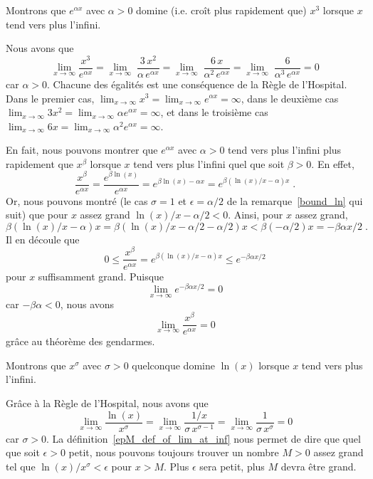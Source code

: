 {\begin{egg}
Montrons que $e^{\alpha x}$ avec $\alpha>0$ domine (i.e. croît plus
rapidement que) $x^3$ lorsque $x$ tend vers plus l'infini.

Nous avons que
\[
\lim_{x\rightarrow \infty} \frac{x^3}{e^{\alpha x}}
= \lim_{x\rightarrow \infty}\; \frac{3\,x^2}{\alpha\,e^{\alpha x}}
= \lim_{x\rightarrow \infty}\; \frac{6\,x}{\alpha^2\,e^{\alpha x}}
= \lim_{x\rightarrow \infty}\; \frac{6}{\alpha^3\,e^{\alpha x}} = 0
\]
car $\alpha>0$.  Chacune des égalités est une conséquence de la Règle
de l'Hospital.  Dans le premier cas,
$\displaystyle \lim_{x\to \infty} x^3 = \lim_{x\to \infty} e^{\alpha x}
= \infty$, dans le deuxième cas 
$\displaystyle \lim_{x\to \infty} 3x^2 = \lim_{x\to \infty} \alpha e^{\alpha x}
= \infty$, et dans le troisième cas
$\displaystyle \lim_{x\to \infty} 6x = \lim_{x\to \infty} \alpha^2 e^{\alpha x}
= \infty$.
\end{egg}

\begin{rmk}[\theory]
En fait, nous pouvons montrer que $e^{\alpha x}$ avec $\alpha>0$ tend
vers plus l'infini plus rapidement que $x^\beta$ lorsque $x$ tend
vers plus l'infini quel que soit $\beta>0$.  En effet,
\[
\frac{x^\beta}{e^{\alpha x}} = \frac{e^{\beta\ln(x)}}{ e^{\alpha x}}
= e^{\beta\ln(x)-\alpha x} = e^{\beta \left( \ln(x)/x - \alpha\right) x}
\; .
\]
Or, nous pouvons montré (le cas $\sigma=1$ et $\epsilon = \alpha/2$ de la
remarque~\ref{bound_ln} qui suit) que pour $x$ assez grand
$\ln(x)/x - \alpha/2 < 0$.  Ainsi, pour $x$ assez grand,
\[
\beta \left( \ln(x)/x - \alpha\right)x
= \beta \left( \ln(x)/x - \alpha/2 - \alpha/2\right) x
< \beta \left( - \alpha/2 \right) x =- \beta \alpha x/2 \; .
\]
Il en découle que
\[
0\leq \frac{x^\beta}{e^{\alpha x}} = e^{\beta \left( \ln(x)/x - \alpha\right) x}
\leq e^{- \beta \alpha x/2 }
\]
pour $x$ suffisamment grand.  Puisque
\[
\lim_{x\rightarrow \infty} e^{-\beta \alpha x/2 } = 0
\]
car $-\beta \alpha <0$, nous avons
\[
\lim_{x\rightarrow \infty} \frac{x^\beta}{e^{\alpha x}} = 0
\]
grâce au théorème des gendarmes.
\end{rmk}

\begin{rmk}[\theory]
Montrons que $x^\sigma$ avec $\sigma>0$ quelconque domine $\ln(x)$ lorsque
$x$ tend vers plus l'infini. 

Grâce à la Règle de l'Hospital, nous avons que
\[
\lim_{x\rightarrow \infty} \frac{\ln(x)}{x^\sigma} =
\lim_{x\rightarrow \infty} \frac{1/x}{\sigma\,x^{\sigma-1}} =
\lim_{x\rightarrow \infty} \frac{1}{\sigma\,x^\sigma} = 0
\]
car $\sigma>0$.  La définition~\ref{epM_def_of_lim_at_inf} nous permet
de dire que quel que soit $\epsilon>0$ petit, nous pouvons toujours trouver
un nombre $M>0$ assez grand tel que $\ln(x)/x^\sigma < \epsilon$ pour
$x>M$.  Plus $\epsilon$ sera petit, plus $M$ devra être grand.
\label{bound_ln}
\end{rmk}

}
